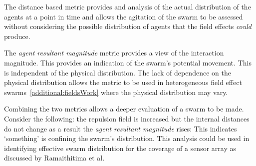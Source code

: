 The distance based metric provides and analysis of the actual distribution of the agents at a point in time and allows the agitation of the swarm to be assessed without considering the possible distribution of agents that the field effects \textit{could} produce.

The \textit{agent resultant magnitude} metric provides a view of the interaction magnitude. This provides an indication of the swarm's potential movement. This is independent of the physical distribution. The lack of dependence on the physical distribution allows the metric to be used in heterogeneous field effect swarms~\autoref{additional:fieldsWork} where the physical distribution may vary. 

Combining the two metrics allows a deeper evaluation of a swarm to be made. Consider the following: the repulsion field is increased but the internal distances do not change as a result the \textit{agent resultant magnitude} rises: This indicates `something' is confining the swarm's distribution. This analysis could be used in identifying effective swarm distribution for the coverage of a sensor array as discussed by Ramaithitima et al.~\cite{RWBK:15}
